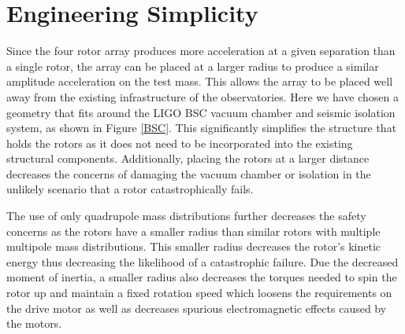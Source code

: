 \documentclass[superscriptaddress, twocolumn, prd]{revtex4-1}
\begin{document}
\section{Engineering Simplicity}

Since the four rotor array produces more acceleration at a given separation than a single rotor, the array can be placed at a larger radius to produce a similar amplitude acceleration on the test mass. This allows the array to be placed well away from the existing infrastructure of the observatories. Here we have chosen a geometry that fits around the LIGO BSC vacuum chamber and seismic isolation system, as shown in Figure \ref{BSC}. This significantly simplifies the structure that holds the rotors as it does not need to be incorporated into the existing structural components. Additionally, placing the rotors at a larger distance decreases the concerns of damaging the vacuum chamber or isolation in the unlikely scenario that a rotor catastrophically fails.

The use of only quadrupole mass distributions further decreases the safety concerns as the rotors have a smaller radius than similar rotors with multiple multipole mass distributions. This smaller radius decreases the rotor's kinetic energy thus decreasing the likelihood of a catastrophic failure. Due the decreased moment of inertia, a smaller radius also decreases the torques needed to spin the rotor up and maintain a fixed rotation speed which loosens the requirements on the drive motor as well as decreases spurious electromagnetic effects caused by the motors. 
\end{document}

